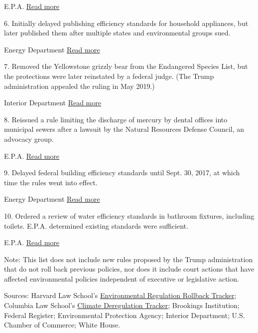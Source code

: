  E.P.A. \textbar{}
\href{https://www.eenews.net/eenewspm/2018/03/22/stories/1060077215}{Read
more}

6. Initially delayed publishing efficiency standards for household
appliances, but later published them after multiple states and
environmental groups sued.

 Energy Department \textbar{}
\href{https://www.washingtonpost.com/climate-environment/after-three-years-and-a-lawsuit-trump-administration-publishes-efficiency-standards-for-big-equipment/2020/01/10/d641474a-33c3-11ea-9313-6cba89b1b9fb_story.html}{Read
more}

7. Removed the Yellowstone grizzly bear from the Endangered Species
List, but the protections were later reinstated by a federal judge. (The
Trump administration appealed the ruling in May 2019.)

 Interior Department \textbar{}
\href{https://www.nytimes3xbfgragh.onion/2018/09/25/science/yellowstone-grizzly-hunt.html}{Read
more}

8. Reissued a rule limiting the discharge of mercury by dental offices
into municipal sewers after a lawsuit by the Natural Resources Defense
Council, an advocacy group.

 E.P.A. \textbar{} \href{https://www.eenews.net/stories/1060056173}{Read
more}

9. Delayed federal building efficiency standards until Sept. 30, 2017,
at which time the rules went into effect.

 Energy Department \textbar{}
\href{https://www.federalregister.gov/documents/2017/03/21/2017-05485/energy-efficiency-standards-for-the-design-and-construction-of-new-federal-low-rise-residential}{Read
more}

10. Ordered a review of water efficiency standards in bathroom fixtures,
including toilets. E.P.A. determined existing standards were sufficient.

 E.P.A. \textbar{}
\href{https://www.vox.com/policy-and-politics/2019/12/7/21000314/trump-toilet-10-15-times-epa-rules}{Read
more}

Note: This list does not include new rules proposed by the Trump
administration that do not roll back previous policies, nor does it
include court actions that have affected environmental policies
independent of executive or legislative action.

Sources: Harvard Law School's
\href{http://environment.law.harvard.edu/policy-initiative/regulatory-rollback-tracker/}{Environmental
Regulation Rollback Tracker}; Columbia Law School's
\href{http://columbiaclimatelaw.com/resources/climate-deregulation-tracker/}{Climate
Deregulation Tracker}; Brookings Institution; Federal Register;
Environmental Protection Agency; Interior Department; U.S. Chamber of
Commerce; White House.


